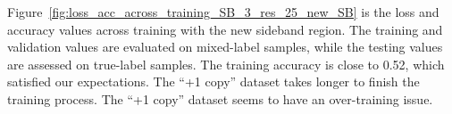 \documentclass[12pt]{article}
\begin{document}
        Figure~\ref{fig:loss_acc_across_training_SB_3_res_25_new_SB} is the loss and accuracy values across training with the new sideband region. The training and validation values are evaluated on mixed-label samples, while the testing values are assessed on true-label samples. The training accuracy is close to 0.52, which satisfied our expectations. The ``+1 copy'' dataset takes longer to finish the training process. The ``+1 copy'' dataset seems to have an over-training issue.
        \begin{figure}[htpb]
            \centering
             \\
\end{figure}
\end{document}
